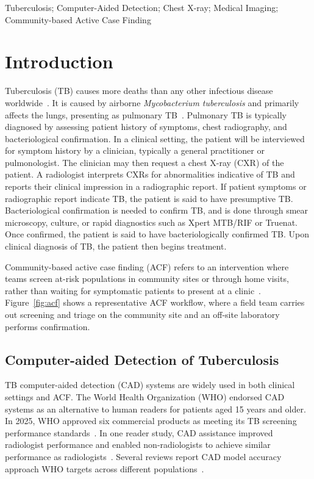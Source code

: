 \documentclass[conference, letterpaper]{IEEEtran}
\begin{document}
\begin{IEEEkeywords}
Tuberculosis; Computer-Aided Detection; Chest X-ray; Medical Imaging; Community-based Active Case Finding
\end{IEEEkeywords}

\IEEEpeerreviewmaketitle

\section{Introduction}

Tuberculosis (TB) causes more deaths than any other infectious disease worldwide~\cite{who_global_tb_2024}. It is caused by airborne \textit{Mycobacterium tuberculosis} and primarily affects the lungs, presenting as pulmonary TB~\cite{pai2016tb}. Pulmonary TB is typically diagnosed by assessing patient history of symptoms, chest radiography, and bacteriological confirmation. In a clinical setting, the patient will be interviewed for symptom history by a clinician, typically a general practitioner or pulmonologist. The clinician may then request a chest X-ray (CXR) of the patient. A radiologist interprets CXRs for abnormalities indicative of TB and reports their clinical impression in a radiographic report. If patient symptoms or radiographic report indicate TB, the patient is said to have presumptive TB. Bacteriological confirmation is needed to confirm TB, and is done through smear microscopy, culture, or rapid diagnostics such as Xpert MTB/RIF or Truenat. Once confirmed, the patient is said to have bacteriologically confirmed TB. Upon clinical diagnosis of TB, the patient then begins treatment.

Community-based active case finding (ACF) refers to an intervention where teams screen at-risk populations in community sites or through home visits, rather than waiting for symptomatic patients to present at a clinic~\cite{who_screening_2021}. Figure~\ref{fig:acf} shows a representative ACF workflow, where a field team carries out screening and triage on the community site and an off-site laboratory performs confirmation.

\subsection{Computer-aided Detection of Tuberculosis}

TB computer-aided detection (CAD) systems are widely used in both clinical settings and ACF. The World Health Organization (WHO) endorsed CAD systems as an alternative to human readers for patients aged 15 years and older. In 2025, WHO approved six commercial products as meeting its TB screening performance standards~\cite{who_cad_approval_2025}. In one reader study, CAD assistance improved radiologist performance and enabled non-radiologists to achieve similar performance as radiologists~\cite{anderson2024deep}. Several reviews report CAD model accuracy approach WHO targets across different populations~\cite{ahmad2023systematic, scott2024tb_cad_africa, han2025tb_meta, marquez2025philippines}.
\end{document}
